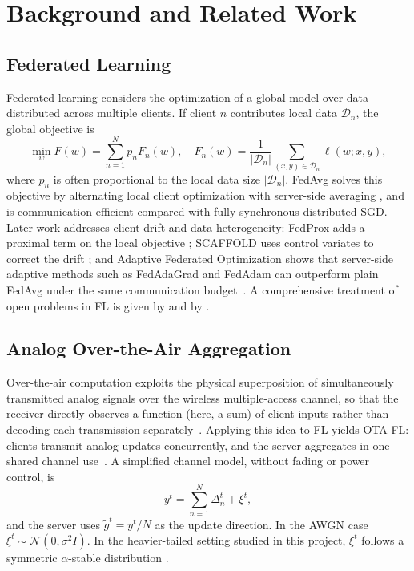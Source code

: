 \chapter{Background and Related Work}

\section{Federated Learning}
Federated learning considers the optimization of a global model
over data distributed across multiple clients. If client $n$ contributes
local data $\mathcal{D}_n$, the global objective is
\begin{equation}
    \min_w F(w) = \sum_{n=1}^{N} p_n F_n(w),
    \quad
    F_n(w) = \frac{1}{|\mathcal{D}_n|}
    \sum_{(x,y)\in\mathcal{D}_n} \ell(w;x,y),
\end{equation}
where $p_n$ is often proportional to the local data size
$|\mathcal{D}_n|$. FedAvg solves this objective by alternating local
client optimization with server-side averaging
\cite{mcmahan2017communication}, and is communication-efficient
compared with fully synchronous distributed SGD. Later work addresses
client drift and data heterogeneity: FedProx adds a proximal term on
the local objective \cite{li2020fedprox}; SCAFFOLD uses control
variates to correct the drift \cite{karimireddy2020scaffold}; and
Adaptive Federated Optimization shows that server-side adaptive
methods such as FedAdaGrad and FedAdam can outperform plain FedAvg
under the same communication budget~\cite{reddi2021adaptive}. A
comprehensive treatment of open problems in FL is given by
\cite{kairouz2021advances} and by
\cite{wang2021field}.

\section{Analog Over-the-Air Aggregation}
Over-the-air computation exploits the physical superposition of
simultaneously transmitted analog signals over the wireless
multiple-access channel, so that the receiver directly observes a
function (here, a sum) of client inputs rather than decoding each
transmission separately~\cite{goldenbaum2013computation,nazer2007computation}.
Applying this idea to FL yields OTA-FL: clients transmit analog
updates concurrently, and the server aggregates in one shared channel
use~\cite{zhu2020broadband,amiri2020machine,yang2020federated,sery2021over,sahin2023survey}.
A simplified channel model, without fading or power control, is
\begin{equation}
    y^t = \sum_{n=1}^{N} \Delta_n^t + \xi^t,
\end{equation}
and the server uses $\tilde{g}^t = y^t/N$ as the update direction. In
the AWGN case $\xi^t \sim \mathcal{N}(0,\sigma^2 I)$. In the
heavier-tailed setting studied in this project, $\xi^t$ follows a
symmetric $\alpha$-stable distribution
\cite{nikias1995alphastable,win2009mathematical}.

